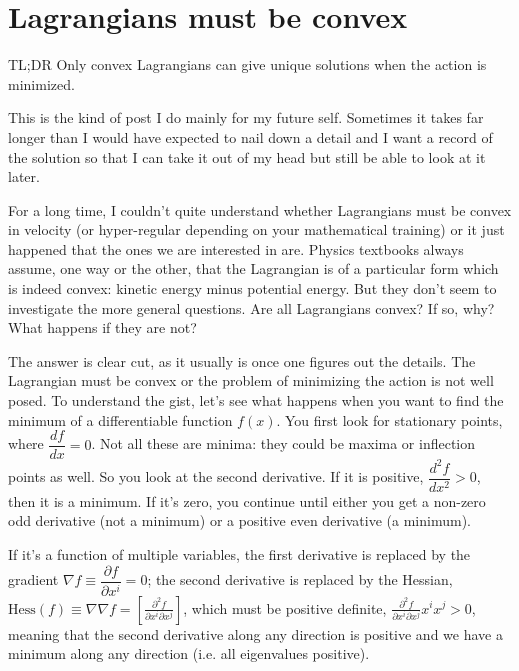 \documentclass[aps,pra,10pt,floatfix,nofootinbib]{revtex4-1}
\theoremstyle{definition}
\begin{document}
	
\section{Lagrangians must be convex}

TL;DR Only convex Lagrangians can give unique solutions when the action is minimized.

This is the kind of post I do mainly for my future self. Sometimes it takes far longer than I would have expected to nail down a detail and I want a record of the solution so that I can take it out of my head but still be able to look at it later.

For a long time, I couldn't quite understand whether Lagrangians must be convex in velocity (or hyper-regular depending on your mathematical training) or it just happened that the ones we are interested in are. Physics textbooks always assume, one way or the other, that the Lagrangian is of a particular form which is indeed convex: kinetic energy minus potential energy. But they don't seem to investigate the more general questions. Are all Lagrangians convex? If so, why? What happens if they are not?

The answer is clear cut, as it usually is once one figures out the details. The Lagrangian must be convex or the problem of minimizing the action is not well posed. To understand the gist, let's see what happens when you want to find the minimum of a differentiable function $f(x)$. You first look for stationary points, where $\dfrac{df}{dx} = 0$. Not all these are minima: they could be maxima or inflection points as well. So you look at the second derivative. If it is positive, $\dfrac{d^2f}{dx^2} > 0$, then it is a minimum. If it's zero, you continue until either you get a non-zero odd derivative (not a minimum) or a positive even derivative (a minimum).

If it's a function of multiple variables, the first derivative is replaced by the gradient $\nabla f \equiv \dfrac{\partial f}{\partial x^i} = 0$; the second derivative is replaced by the Hessian, $\textrm{Hess}(f) \equiv \nabla \nabla f = \left[\frac{\partial^2f}{\partial x^i \partial x^j}\right]$, which must be positive definite, $\frac{\partial^2f}{\partial x^i \partial x^j} x^i x^j > 0$, meaning that the second derivative along any direction is positive and we have a minimum along any direction (i.e. all eigenvalues positive).
\end{document}
